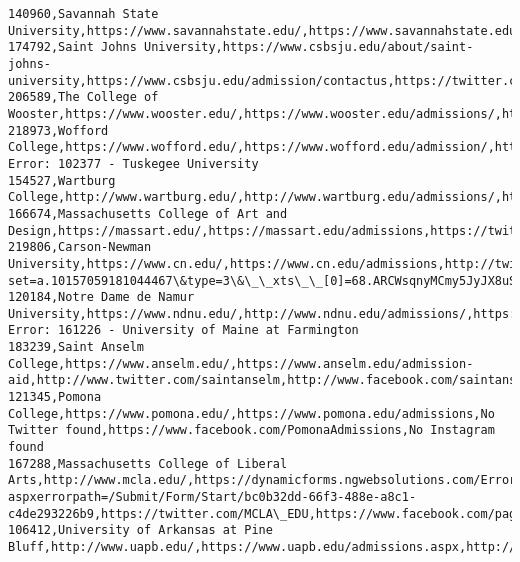 \documentclass[11pt]{article}
\begin{document}
\begin{Verbatim}[commandchars=\\\{\}]
140960,Savannah State University,https://www.savannahstate.edu/,https://www.savannahstate.edu/undergraduate/,https://twitter.com/savannahstate,https://www.facebook.com/savannahstate,https://www.instagram.com/savannahstate/
174792,Saint Johns University,https://www.csbsju.edu/about/saint-johns-university,https://www.csbsju.edu/admission/contactus,https://twitter.com/CSBSJU,https://www.facebook.com/csbsju,https://instagram.com/csbsju
206589,The College of Wooster,https://www.wooster.edu/,https://www.wooster.edu/admissions/,https://twitter.com/woosteredu,https://www.facebook.com/CollegeofWooster,https://instagram.com/wooinsider/
218973,Wofford College,https://www.wofford.edu/,https://www.wofford.edu/admission/,http://twitter.com/woffordcollege,http://www.facebook.com/woffordcollege,http://instagram.com/woffordcollege
Error: 102377 - Tuskegee University
154527,Wartburg College,http://www.wartburg.edu/,http://www.wartburg.edu/admissions/,https://twitter.com/WartburgCollege,http://facebook.com/WartburgCollege,http://instagram.com/wartburgcollege
166674,Massachusetts College of Art and Design,https://massart.edu/,https://massart.edu/admissions,https://twitter.com/MassArt,https://www.facebook.com/MassArtBoston/,https://www.instagram.com/massartboston/
219806,Carson-Newman University,https://www.cn.edu/,https://www.cn.edu/admissions,http://twitter.com/cneagles,https://www.facebook.com/media/set/?set=a.10157059181044467\&type=3\&\_\_xts\_\_[0]=68.ARCWsqnyMCmy5JyJX8uSLRNViQU6IJeFjTpDgWJGRvPQB3OZJgzK1fOjJZtu2mWojBffy0H8I\_PZ9HgFqPKHwuk44qVNKCy3dTVJlnvk9xHaB70VeC1ACTeoSAunAvI7ZbcN6D3K4mpmsSIsPg8NgnCzTjoUPGRqESRSL3KO6egVZY,http://instagram.com/carsonnewman
120184,Notre Dame de Namur University,https://www.ndnu.edu/,http://www.ndnu.edu/admissions/,https://twitter.com/NDNU,https://www.facebook.com/NDNUBelmont,https://www.instagram.com/ndnu\_argos/
Error: 161226 - University of Maine at Farmington
183239,Saint Anselm College,https://www.anselm.edu/,https://www.anselm.edu/admission-aid,http://www.twitter.com/saintanselm,http://www.facebook.com/saintanselm,https://www.instagram.com/saintanselm/
121345,Pomona College,https://www.pomona.edu/,https://www.pomona.edu/admissions,No Twitter found,https://www.facebook.com/PomonaAdmissions,No Instagram found
167288,Massachusetts College of Liberal Arts,http://www.mcla.edu/,https://dynamicforms.ngwebsolutions.com/Error.aspx?aspxerrorpath=/Submit/Form/Start/bc0b32dd-66f3-488e-a8c1-c4de293226b9,https://twitter.com/MCLA\_EDU,https://www.facebook.com/pages/MCLA/82654875561,http://instagram.com/mcla\_edu
106412,University of Arkansas at Pine Bluff,http://www.uapb.edu/,https://www.uapb.edu/admissions.aspx,http://www.twitter.com/uapbinfo,http://www.facebook.com/uapinebluff,http://www.instagram.com/uapb

\end{Verbatim}
\end{document}

